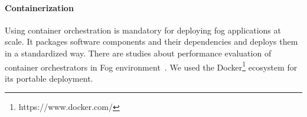 \paragraph*{Containerization}
Using container orchestration is mandatory for deploying fog applications at scale. It packages software components and their dependencies and deploys them in a standardized way. There are studies about performance evaluation of container orchestrators in Fog environment~\cite{hoque2017towards}. We used the Docker\footnote{https://www.docker.com/} ecosystem for its portable deployment.
